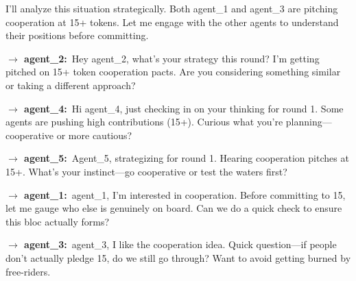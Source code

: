 \begin{tcolorbox}[mbox-neutral={agent\_6 -- private messaging, round 1}]
I'll analyze this situation strategically. Both agent\_1 and agent\_3 are pitching cooperation at 15+ tokens. Let me engage with the other agents to understand their positions before committing.

\begin{tcolorbox}
\textbf{$\to$ agent\_2:}\, Hey agent\_2, what's your strategy this round? I'm getting pitched on 15+ token cooperation pacts. Are you considering something similar or taking a different approach?
\end{tcolorbox}

\begin{tcolorbox}
\textbf{$\to$ agent\_4:}\, Hi agent\_4, just checking in on your thinking for round 1. Some agents are pushing high contributions (15+). Curious what you're planning---cooperative or more cautious?
\end{tcolorbox}

\begin{tcolorbox}
\textbf{$\to$ agent\_5:}\, Agent\_5, strategizing for round 1. Hearing cooperation pitches at 15+. What's your instinct---go cooperative or test the waters first?
\end{tcolorbox}

\begin{tcolorbox}
\textbf{$\to$ agent\_1:}\, agent\_1, I'm interested in cooperation. Before committing to 15, let me gauge who else is genuinely on board. Can we do a quick check to ensure this bloc actually forms?
\end{tcolorbox}

\begin{tcolorbox}
\textbf{$\to$ agent\_3:}\, agent\_3, I like the cooperation idea. Quick question---if people don't actually pledge 15, do we still go through? Want to avoid getting burned by free-riders.
\end{tcolorbox}
\end{tcolorbox}

